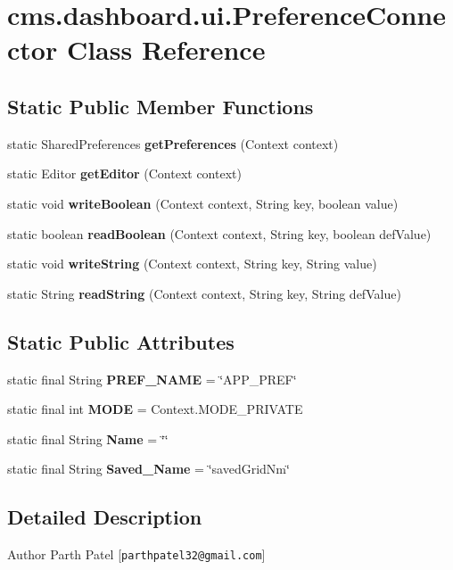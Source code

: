 \section{cms.\-dashboard.\-ui.\-Preference\-Connector \-Class \-Reference}
\label{classcms_1_1dashboard_1_1ui_1_1_preference_connector}
\subsection*{\-Static \-Public \-Member \-Functions}
\begin{DoxyCompactItemize}
\item 
static \-Shared\-Preferences {\bf get\-Preferences} (\-Context context)
\item 
static \-Editor {\bf get\-Editor} (\-Context context)
\item 
static void {\bf write\-Boolean} (\-Context context, \-String key, boolean value)
\item 
static boolean {\bf read\-Boolean} (\-Context context, \-String key, boolean def\-Value)
\item 
static void {\bf write\-String} (\-Context context, \-String key, \-String value)
\item 
static \-String {\bf read\-String} (\-Context context, \-String key, \-String def\-Value)
\end{DoxyCompactItemize}
\subsection*{\-Static \-Public \-Attributes}
\begin{DoxyCompactItemize}
\item 
static final \-String {\bf \-P\-R\-E\-F\-\_\-\-N\-A\-M\-E} = \char`\"{}\-A\-P\-P\-\_\-\-P\-R\-E\-F\char`\"{}
\item 
static final int {\bf \-M\-O\-D\-E} = \-Context.\-M\-O\-D\-E\-\_\-\-P\-R\-I\-V\-A\-T\-E
\item 
static final \-String {\bf \-Name} = \char`\"{}\char`\"{}
\item 
static final \-String {\bf \-Saved\-\_\-\-Name} = \char`\"{}saved\-Grid\-Nm\char`\"{}
\end{DoxyCompactItemize}


\subsection{\-Detailed \-Description}
\begin{DoxyAuthor}{\-Author}
\-Parth \-Patel [{\tt parthpatel32@gmail.\-com}] 
\end{DoxyAuthor}


